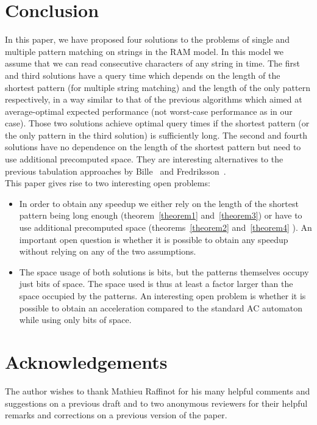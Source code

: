 \documentclass{article}
\newcommand{\?}{\mskip1.5mu}
\begin{document}
\section{Conclusion}
In this paper, we have proposed four solutions to the problems of single and multiple pattern matching on strings in the RAM model. In this model we assume that we can read  consecutive characters of any string in  time. The first and third solutions have a query time which depends on the length of the shortest pattern (for multiple string matching) and the length of the only pattern respectively, in a way similar to that of the previous algorithms which aimed at average-optimal expected performance (not worst-case performance as in our case). Those two solutions achieve optimal query times if the shortest pattern (or the only pattern in the third solution) is sufficiently long. The second and fourth solutions have no dependence on the length of the shortest pattern but need to use additional precomputed space. They are interesting alternatives to the previous tabulation approaches by Bille~\cite{B09} and Fredriksson~\cite{F02}.
\\




This paper gives rise to two interesting open problems: 

\begin{itemize}
\item In order to obtain any speedup we either rely on the length of the shortest pattern being long enough (theorem~\ref{theorem1} and~\ref{theorem3}) or have to use additional precomputed space (theorems~\ref{theorem2} and~\ref{theorem4} ). An important open question is whether it is possible to obtain any speedup without relying on any of the two assumptions.
\item The space usage of both solutions is  bits, but the patterns themselves occupy just  bits of space. The space used is thus at least a factor  larger than the space occupied by the patterns. An interesting open problem is whether it is possible to obtain an acceleration compared to the standard AC automaton while using only  bits of space.
\end{itemize} 
\section*{Acknowledgements}
The author wishes to thank Mathieu Raffinot for his many helpful comments and suggestions on a previous draft and to two anonymous reviewers for their helpful remarks and corrections on a previous version of the paper. 
\small 
 
\normalsize
\end{document}
